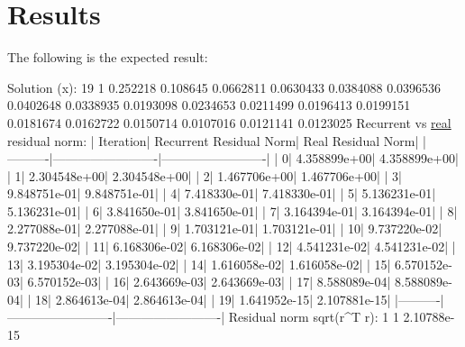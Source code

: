 \section*{Results}

The following is the expected result\+:


\begin{DoxyCode}
Solution (x):
19 1
0.252218
0.108645
0.0662811
0.0630433
0.0384088
0.0396536
0.0402648
0.0338935
0.0193098
0.0234653
0.0211499
0.0196413
0.0199151
0.0181674
0.0162722
0.0150714
0.0107016
0.0121141
0.0123025
Recurrent vs \hyperlink{namespacegko_ae23cfd886cee6e88d77bcbbbe1928b78}{real} residual norm:
| Iteration|  Recurrent Residual Norm|       Real Residual Norm|
|----------|-------------------------|-------------------------|
|         0|             4.358899e+00|             4.358899e+00|
|         1|             2.304548e+00|             2.304548e+00|
|         2|             1.467706e+00|             1.467706e+00|
|         3|             9.848751e-01|             9.848751e-01|
|         4|             7.418330e-01|             7.418330e-01|
|         5|             5.136231e-01|             5.136231e-01|
|         6|             3.841650e-01|             3.841650e-01|
|         7|             3.164394e-01|             3.164394e-01|
|         8|             2.277088e-01|             2.277088e-01|
|         9|             1.703121e-01|             1.703121e-01|
|        10|             9.737220e-02|             9.737220e-02|
|        11|             6.168306e-02|             6.168306e-02|
|        12|             4.541231e-02|             4.541231e-02|
|        13|             3.195304e-02|             3.195304e-02|
|        14|             1.616058e-02|             1.616058e-02|
|        15|             6.570152e-03|             6.570152e-03|
|        16|             2.643669e-03|             2.643669e-03|
|        17|             8.588089e-04|             8.588089e-04|
|        18|             2.864613e-04|             2.864613e-04|
|        19|             1.641952e-15|             2.107881e-15|
|----------|-------------------------|-------------------------|
Residual norm sqrt(r^T r):
1 1
2.10788e-15
\end{DoxyCode}


